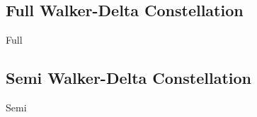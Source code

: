 \subsection{Full Walker-Delta Constellation}
{Full}

\subsection{Semi Walker-Delta Constellation}
{Semi}

